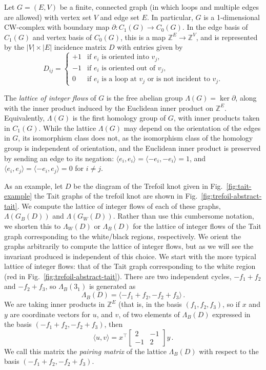 \documentclass[12pt]{report}
\newcommand{\Z}{\mathbb{Z}}
\newcommand{\ip}[2]{\langle #1, #2 \rangle}
\theoremstyle{upright}
\begin{document}
Let $G = (E, V)$ be a finite, connected graph (in which loops and multiple edges are allowed) with vertex set $V$ and edge set $E$. In particular, $G$ is a 1-dimensional CW-complex with boundary map $\partial: C_{1}(G) \longrightarrow C_{0}(G)$. In the edge basis of $C_{1}(G)$ and vertex basis of $C_{0}(G)$, this is a map $\Z^{E} \longrightarrow \Z^{V}$, and is represented by the $|V|\times|E|$ incidence matrix $D$ with entries given by
\[D_{ij} = \begin{cases}
	+1 & \text{if $e_{i}$ is oriented into $v_{j}$,}   \\
	-1 & \text{if $e_{i}$ is oriented out of $v_{j}$,} \\
	0  & \text{if $e_{i}$ is a loop at $v_{j}$ or is not incident to $v_{j}$.}
\end{cases}\]

The \textit{lattice of integer flows} of $G$ is the free abelian group $\Lambda(G) = \ker \partial$, along with the inner product induced by the Euclidean inner product on $\Z^{E}$. Equivalently, $\Lambda(G)$ is the first homology group of $G$, with inner products taken in $C_{1}(G)$. While the lattice $\Lambda(G)$ may depend on the orientation of the edges in $G$, its isomorphism class does not, as the isomorphism class of the homology group is independent of orientation, and the Euclidean inner product is preserved by sending an edge to its negation: $\ip{e_{i}}{e_{i}} =  \ip{-e_{i}}{-e_{i}} = 1$, and $\ip{e_{i}}{e_{j}} = \ip{-e_{i}}{e_{j}} = 0$ for $i \neq j$.

As an example, let $D$ be the diagram of the Trefoil knot given in Fig.~\ref{fig:tait-example} the Tait graphs of the trefoil knot   are shown in Fig.~\ref{fig:trefoil-abstract-tait}. We compute the lattice of integer flows of each of these graphs, $\Lambda(G_{B}(D))$ and $\Lambda(G_W(D))$. Rather than use this cumbersome notation, we shorten this to $\Lambda_{W}(D)$ or $\Lambda_{B}(D)$ for the lattice of integer flows of the Tait graph corresponding to the white/black regions, respectively. We orient the graphs arbitrarily to compute the lattice of integer flows, but as we will see the invariant produced is independent of this choice. We start with the more typical lattice of integer flows: that of the Tait graph corresponding to the white region (red in Fig.~\ref{fig:trefoil-abstract-tait}). There are two independent cycles, $-f_{1} + f_{2}$ and $-f_{2} + f_{3}$, so $\Lambda_{B}(3_{1})$ is generated as
\[\Lambda_{B}(D) = \langle -f_{1} + f_{2}, -f_{2} + f_{3} \rangle\,.\]
We are taking inner products in $\Z^{E}$ (that is, in the basis {$(f_{1}, f_{2}, f_{3})$}, so if $x$ and $y$ are coordinate vectors for $u$, and $v$, of two elements of $\Lambda_{B}(D)$ expressed in the basis $(-f_{1} + f_{2}, -f_{2} + f_{3})$, then
\[\langle u, v \rangle = x^{\top}\begin{bmatrix}
	2  & -1 \\
	-1 & 2
\end{bmatrix}y\,.\]
We call this matrix the \textit{pairing matrix} of the lattice $\Lambda_{B}(D)$ with respect to the basis ${(-f_{1} + f_{2}, -f_{2} + f_{3})}$.
\end{document}
